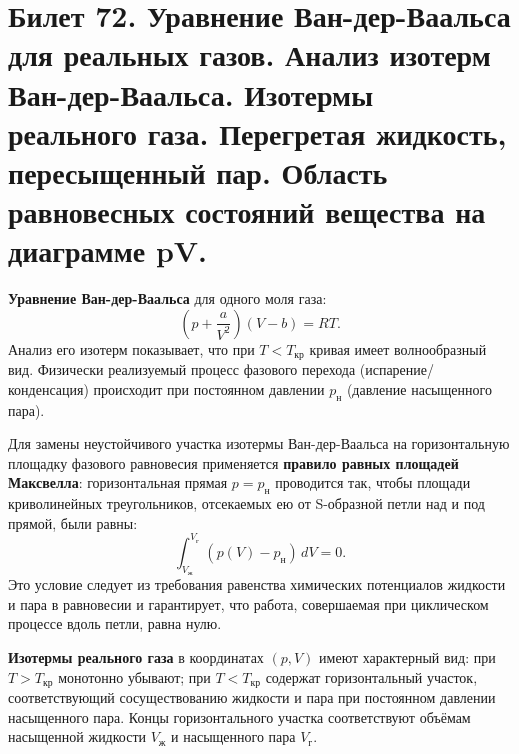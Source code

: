 \section{Билет 72. Уравнение Ван-дер-Ваальса для реальных газов. Анализ изотерм Ван-дер-Ваальса. Изотермы реального газа. Перегретая жидкость, пересыщенный пар. Область равновесных состояний вещества на диаграмме pV.}

\begin{definition}
\textbf{Уравнение Ван-дер-Ваальса} для одного моля газа:
\begin{equation}
    \left(p + \frac{a}{V^2}\right)(V - b) = R T. \label{eq:vdw_72}
\end{equation}
Анализ его изотерм показывает, что при $T < T_{\text{кр}}$ кривая имеет волнообразный вид. Физически реализуемый процесс фазового перехода (испарение/конденсация) происходит при постоянном давлении $p_{\text{н}}$ (давление насыщенного пара).
\end{definition}

\begin{theorem}
Для замены неустойчивого участка изотермы Ван-дер-Ваальса на горизонтальную площадку фазового равновесия применяется \textbf{правило равных площадей Максвелла}:
горизонтальная прямая $p = p_{\text{н}}$ проводится так, чтобы площади криволинейных треугольников, отсекаемых ею от S-образной петли над и под прямой, были равны:
\begin{equation}
    \int_{V_{\text{ж}}}^{V_{\text{г}}} (p(V) - p_{\text{н}}) \, dV = 0. \label{eq:maxwell_rule_72}
\end{equation}
Это условие следует из требования равенства химических потенциалов жидкости и пара в равновесии и гарантирует, что работа, совершаемая при циклическом процессе вдоль петли, равна нулю.
\end{theorem}

\begin{definition}
\textbf{Изотермы реального газа} в координатах $(p, V)$ имеют характерный вид: при $T > T_{\text{кр}}$ монотонно убывают; при $T < T_{\text{кр}}$ содержат горизонтальный участок, соответствующий сосуществованию жидкости и пара при постоянном давлении насыщенного пара. Концы горизонтального участка соответствуют объёмам насыщенной жидкости $V_{\text{ж}}$ и насыщенного пара $V_{\text{г}}$.
\end{definition}


